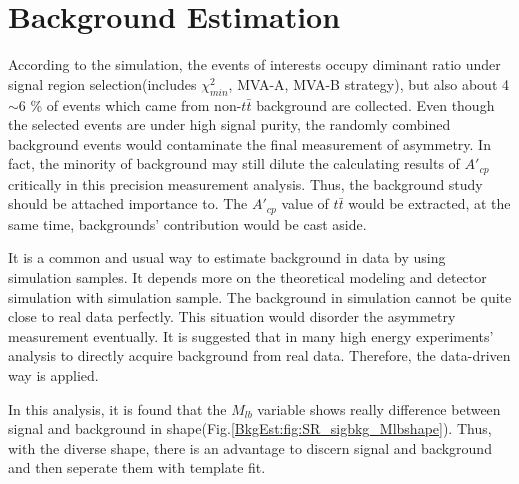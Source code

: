 

\section{Background Estimation}
\label{sec:BkgEst}

	According to the simulation, the events of interests occupy diminant ratio under signal region selection(includes $\chi^2_{min}$, MVA-A, MVA-B strategy), but also about 4$\sim$6 \% of events which came from non-$t\bar{t}$ background are collected. Even though the selected events are under high signal purity, the randomly combined background events would contaminate the final measurement of asymmetry. In fact, the minority of background may still dilute the calculating results of $A'_{cp}$ critically in this precision measurement analysis. Thus, the background study should be attached importance to. The $A'_{cp}$ value of $t\bar{t}$ would be extracted, at the same time, backgrounds' contribution would be cast aside.

	It is a common and usual way to estimate background in data by using simulation samples. It depends more on the theoretical modeling and detector simulation with simulation sample. The background in simulation cannot be quite close to real data perfectly. This situation would disorder the asymmetry measurement eventually. It is suggested that in many high energy experiments' analysis to directly acquire background from real data. Therefore, the data-driven way is applied.
	
	In this analysis, it is found that the $M_{lb}$ variable shows really difference between signal and background in shape(Fig.\ref{BkgEst:fig:SR_sigbkg_Mlbshape}). Thus, with the diverse shape, there is an advantage to discern signal and background and then seperate them with template fit.

